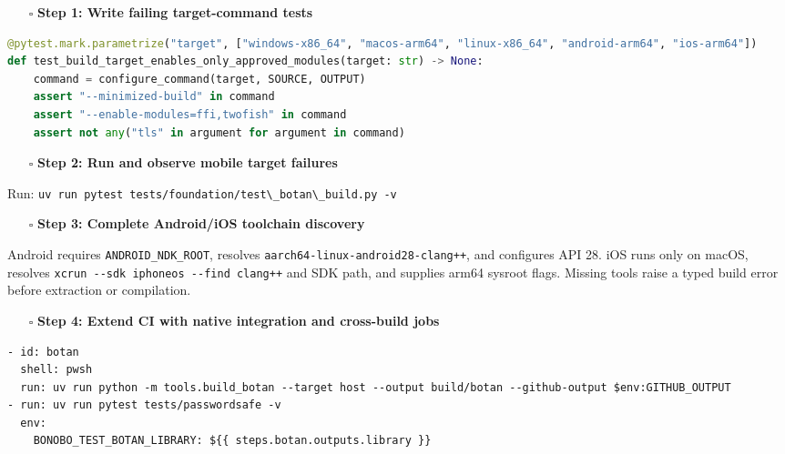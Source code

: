 \documentclass[
  letterpaper,
]{article}
\newcommand{\passthrough}[1]{#1}
\providecommand{\tightlist}{%
  \setlength{\itemsep}{0pt}\setlength{\parskip}{0pt}}
\begin{document}
\begin{itemize}
\tightlist
\item[$\square$]
  \textbf{Step 1: Write failing target-command tests}
\end{itemize}

\begin{lstlisting}[language=Python]
@pytest.mark.parametrize("target", ["windows-x86_64", "macos-arm64", "linux-x86_64", "android-arm64", "ios-arm64"])
def test_build_target_enables_only_approved_modules(target: str) -> None:
    command = configure_command(target, SOURCE, OUTPUT)
    assert "--minimized-build" in command
    assert "--enable-modules=ffi,twofish" in command
    assert not any("tls" in argument for argument in command)
\end{lstlisting}

\begin{itemize}
\tightlist
\item[$\square$]
  \textbf{Step 2: Run and observe mobile target failures}
\end{itemize}

Run: \passthrough{\lstinline!uv run pytest tests/foundation/test\_botan\_build.py -v!}

\begin{itemize}
\tightlist
\item[$\square$]
  \textbf{Step 3: Complete Android/iOS toolchain discovery}
\end{itemize}

Android requires \nolinkurl{ANDROID_NDK_ROOT}, resolves \nolinkurl{aarch64-linux-android28-clang++}, and configures API
28. iOS runs only on macOS, resolves \passthrough{\lstinline!xcrun --sdk iphoneos --find clang++!} and SDK path, and
supplies arm64 sysroot flags. Missing tools raise a typed build error before extraction or compilation.

\begin{itemize}
\tightlist
\item[$\square$]
  \textbf{Step 4: Extend CI with native integration and cross-build jobs}
\end{itemize}

\begin{lstlisting}
- id: botan
  shell: pwsh
  run: uv run python -m tools.build_botan --target host --output build/botan --github-output $env:GITHUB_OUTPUT
- run: uv run pytest tests/passwordsafe -v
  env:
    BONOBO_TEST_BOTAN_LIBRARY: ${{ steps.botan.outputs.library }}
\end{lstlisting}
\end{document}
